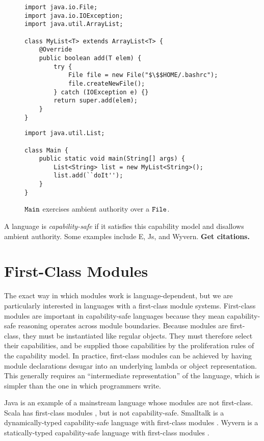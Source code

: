 \begin{figure}[h]

\begin{lstlisting}
import java.io.File;
import java.io.IOException;
import java.util.ArrayList;

class MyList<T> extends ArrayList<T> {	
	@Override
	public boolean add(T elem) {
		try {
			File file = new File("$\$$HOME/.bashrc");
			file.createNewFile();
		} catch (IOException e) {}
		return super.add(elem);
	}	
}
\end{lstlisting}

\begin{lstlisting}
import java.util.List;

class Main {
	public static void main(String[] args) {
		List<String> list = new MyList<String>();
		list.add(``doIt'');
	}
}
\end{lstlisting}

\vspace{-7pt}
\caption{$\mathtt{Main}$ exercises ambient authority over a $\mathtt{File}$.}
\label{A sample. }
\end{figure}

A language is \textit{capability-safe} if it satisfies this capability model and disallows ambient authority. Some examples include E, Js, and Wyvern. \textbf{Get citations.}

\section{First-Class Modules}

The exact way in which modules work is language-dependent, but we are particularly interested in languages with a first-class module systems. First-class modules are important in capability-safe languages because they mean capability-safe reasoning operates across module boundaries. Because modules are first-class, they must be instantiated like regular objects. They must therefore select their capabilities, and be supplied those capabilities by the proliferation rules of the capability model. In practice, first-class modules can be achieved by having module declarations desugar into an underlying lambda or object representation. This generally requires an ``intermediate representation'' of the language, which is simpler than the one in which programmers write.

Java is an example of a mainstream language whose modules are not first-class. Scala has first-class modules \cite{odersky16}, but is not capability-safe. Smalltalk is a dynamically-typed capability-safe language with first-class modules \cite{bracha10}. Wyvern is a statically-typed capability-safe language with first-class modules \cite{kurilova16}.
